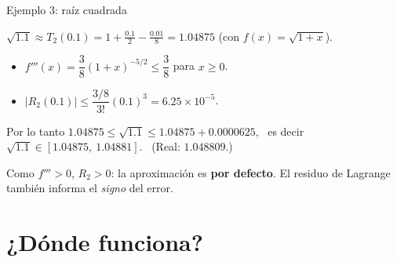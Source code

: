 \documentclass[10pt,aspectratio=169]{beamer}
\begin{document}
\begin{frame}{Ejemplo 3: raíz cuadrada}
  \begin{ejemplo}
    $\sqrt{1.1}\approx T_2(0.1)=1+\frac{0.1}{2}-\frac{0.01}{8}=1.04875$ (con $f(x)=\sqrt{1+x}$).
    \begin{itemize}
      \item $f'''(x)=\dfrac38(1+x)^{-5/2}\le\dfrac38$ para $x\ge0$.
      \item $|R_2(0.1)|\le\dfrac{3/8}{3!}(0.1)^3=6.25\times10^{-5}$.
    \end{itemize}
    Por lo tanto $1.04875\le\sqrt{1.1}\le1.04875+0.0000625$, \ es decir $\sqrt{1.1}\in[1.04875,\ 1.04881]$. \ (Real: $1.048809$.)
  \end{ejemplo}
  \begin{observacion}
    Como $f'''>0$, $R_2>0$: la aproximación es \textbf{por defecto}. El residuo de Lagrange también informa el \emph{signo} del error.
  \end{observacion}
\end{frame}

\section{¿Dónde funciona?}
\end{document}
